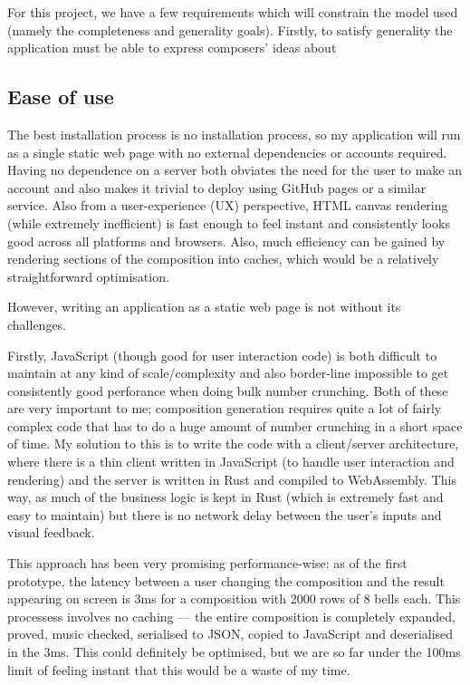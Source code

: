 \documentclass[12pt]{article}
\newcommand{\br}[0]{\vspace{10pt} \noindent}
\begin{document}
For this project, we have a few requirements which will constrain the model used (namely the
completeness and generality goals).  Firstly, to satisfy generality the application must be able to
express composers' ideas about 

\subsection{Ease of use}

The best installation process is no installation process, so my application will run as a single
static web page with no external dependencies or accounts required.  Having no dependence on a
server both obviates the need for the user to make an account and also makes it trivial to deploy
using GitHub pages or a similar service.  Also from a user-experience (UX) perspective, HTML canvas
rendering (while extremely inefficient) is fast enough to feel instant and consistently looks good
across all platforms and browsers.  Also, much efficiency can be gained by rendering sections of the
composition into caches, which would be a relatively straightforward optimisation.

However, writing an application as a static web page is not without its challenges.

\br{}Firstly, JavaScript (though good for user interaction code) is both difficult to maintain
at any kind of scale/complexity and also border-line impossible to get consistently good perforance
when doing bulk number crunching.  Both of these are very important to me; composition generation
requires quite a lot of fairly complex code that has to do a huge amount of number crunching in a
short space of time.  My solution to this is to write the code with a client/server architecture,
where there is a thin client written in JavaScript (to handle user interaction and rendering) and
the server is written in Rust and compiled to WebAssembly.  This way, as much of the business logic
is kept in Rust (which is extremely fast and easy to maintain) but there is no network delay between
the user's inputs and visual feedback.

This approach has been very promising performance-wise: as of the first prototype, the latency
between a user changing the composition and the result appearing on screen is 3ms for a composition
with 2000 rows of 8 bells each.  This processess involves no caching --- the entire composition is
completely expanded, proved, music checked, serialised to JSON, copied to JavaScript and
deserialised in the 3ms.  This could definitely be optimised, but we are so far under the 100ms
limit of feeling instant that this would be a waste of my time.
\end{document}
